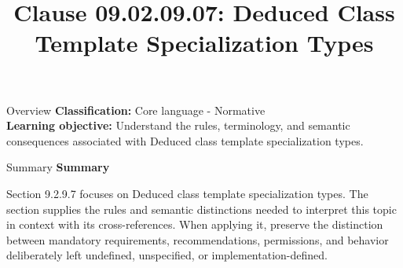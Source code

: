 \documentclass[10pt,letterpaper]{article}
\title{Clause 09.02.09.07: Deduced Class Template Specialization Types}
\author{}
\date{}
\begin{document}
\maketitle
\begin{CornellOverviewBox}{Overview}
\textbf{Classification:} Core language - Normative\\[2pt]
\textbf{Learning objective:} Understand the rules, terminology, and semantic consequences associated with Deduced class template specialization types.
\end{CornellOverviewBox}\begin{CornellSummaryBox}{Summary}
{\sffamily\bfseries\color{Accent} Summary}\par\vspace{3pt}Section 9.2.9.7 focuses on Deduced class template specialization types. The section supplies the rules and semantic distinctions needed to interpret this topic in context with its cross-references. When applying it, preserve the distinction between mandatory requirements, recommendations, permissions, and behavior deliberately left undefined, unspecified, or implementation-defined.
\end{CornellSummaryBox}
\end{document}
